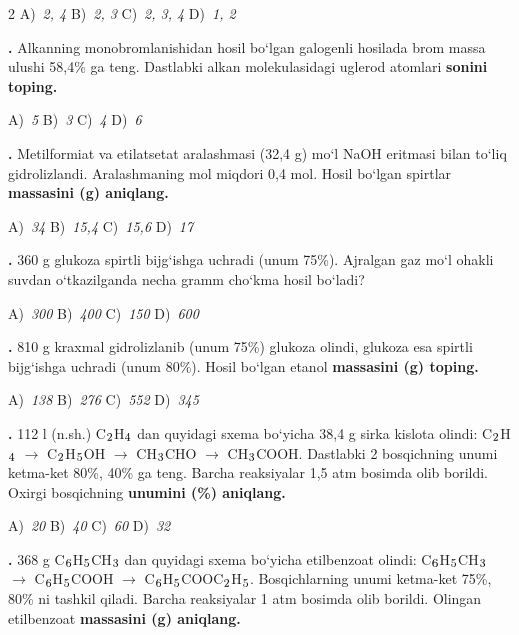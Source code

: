\documentclass[11pt,a4paper]{article}
\renewcommand{\textsubscript}[1]{\ensuremath{_{\text{\fontsize{8}{8}\selectfont #1}}}}
\newcommand{\qn}[1]{\textbf{\fontsize{11.5}{13}\selectfont #1}}
\newcommand{\qsep}{\par\vspace{13pt}}
\begin{document}
\begin{multicols}{2}
\noindent A)~\textsl{2, 4} \hfill B)~\textsl{2, 3} \hfill C)~\textsl{2, 3, 4} \hfill D)~\textsl{1, 2}\par
\qsep
\noindent\qn{23.} Alkanning monobromlanishidan hosil bo`lgan galogenli hosilada brom massa ulushi 58,4\% ga teng. Dastlabki alkan molekulasidagi uglerod atomlari \textbf{sonini toping.}

\noindent A)~\textsl{5} \hfill B)~\textsl{3} \hfill C)~\textsl{4} \hfill D)~\textsl{6}\par
\qsep
\noindent\qn{24.} Metilformiat va etilatsetat aralashmasi (32,4 g) mo`l NaOH eritmasi bilan to`liq gidrolizlandi. Aralashmaning mol miqdori 0,4 mol. Hosil bo`lgan spirtlar \textbf{massasini (g) aniqlang.}

\noindent A)~\textsl{34} \hfill B)~\textsl{15,4} \hfill C)~\textsl{15,6} \hfill D)~\textsl{17}\par
\qsep
\noindent\qn{25.} 360 g glukoza spirtli bijg`ishga uchradi (unum 75\%). Ajralgan gaz mo`l ohakli suvdan o`tkazilganda necha gramm cho`kma hosil bo`ladi?

\noindent A)~\textsl{300} \hfill B)~\textsl{400} \hfill C)~\textsl{150} \hfill D)~\textsl{600}\par
\qsep
\noindent\qn{26.} 810 g kraxmal gidrolizlanib (unum 75\%) glukoza olindi, glukoza esa spirtli bijg`ishga uchradi (unum 80\%). Hosil bo`lgan etanol \textbf{massasini (g) toping.}

\noindent A)~\textsl{138} \hfill B)~\textsl{276} \hfill C)~\textsl{552} \hfill D)~\textsl{345}\par
\qsep
\noindent\qn{27.} 112 l (n.sh.) C\textsubscript{2}H\textsubscript{4} dan quyidagi sxema bo`yicha 38,4 g sirka kislota olindi: C\textsubscript{2}H\textsubscript{4} $\to$ C\textsubscript{2}H\textsubscript{5}OH $\to$ CH\textsubscript{3}CHO $\to$ CH\textsubscript{3}COOH. Dastlabki 2 bosqichning unumi ketma-ket 80\%, 40\% ga teng. Barcha reaksiyalar 1,5 atm bosimda olib borildi. Oxirgi bosqichning \textbf{unumini (\%) aniqlang.}

\noindent A)~\textsl{20} \hfill B)~\textsl{40} \hfill C)~\textsl{60} \hfill D)~\textsl{32}\par
\qsep
\noindent\qn{28.} 368 g C\textsubscript{6}H\textsubscript{5}CH\textsubscript{3} dan quyidagi sxema bo`yicha etilbenzoat olindi: C\textsubscript{6}H\textsubscript{5}CH\textsubscript{3} $\to$ C\textsubscript{6}H\textsubscript{5}COOH $\to$ C\textsubscript{6}H\textsubscript{5}COOC\textsubscript{2}H\textsubscript{5}. Bosqichlarning unumi ketma-ket 75\%, 80\% ni tashkil qiladi. Barcha reaksiyalar 1 atm bosimda olib borildi. Olingan etilbenzoat \textbf{massasini (g) aniqlang.}


\end{multicols}
\end{document}
